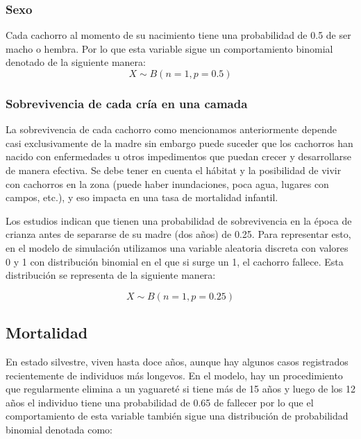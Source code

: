 \documentclass{article}
\begin{document}
        \subsubsection{Sexo}
            Cada cachorro al momento de su nacimiento tiene una probabilidad de 0.5 de ser macho o hembra. Por lo que esta variable sigue un comportamiento binomial denotado de la siguiente manera:
            \begin{equation}
                X \sim B(n=1, p=0.5)
            \end{equation}
        \subsubsection{Sobrevivencia de cada cría en una camada}
            La sobrevivencia de cada cachorro como mencionamos anteriormente depende casi exclusivamente de la madre sin embargo puede suceder que los cachorros han nacido con enfermedades u otros impedimentos que puedan crecer y desarrollarse de manera efectiva. Se debe tener en cuenta el hábitat y la posibilidad de vivir con cachorros en la zona (puede haber inundaciones, poca agua, lugares con campos, etc.), y eso impacta en una tasa de mortalidad infantil.
            
            Los estudios indican que tienen una probabilidad de sobrevivencia en la época de crianza antes de separarse de su madre (dos años) de 0.25. Para representar esto, en el modelo de simulación utilizamos una variable aleatoria discreta con valores 0 y 1 con distribución binomial en el que si surge un 1, el cachorro fallece. Esta distribución se representa de la siguiente manera:

            \begin{equation}
                X \sim B(n=1, p=0.25)
            \end{equation}
            
    \subsection{Mortalidad}
        En estado silvestre, viven hasta doce años, aunque hay algunos casos registrados recientemente de individuos más longevos. En el modelo, hay un procedimiento que regularmente elimina a un yaguareté si tiene más de 15 años y luego de los 12 años el individuo tiene una probabilidad de 0.65 de fallecer por lo que el comportamiento de esta variable también sigue una distribución de probabilidad binomial denotada como:
        
\end{document}
